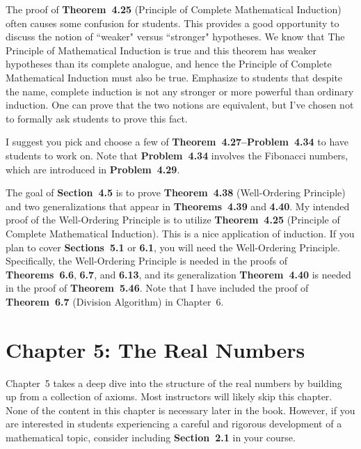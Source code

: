 \documentclass[11pt]{article}%
\newcommand{\blankline}{\pagebreak[2]\vspace{.5\baselineskip}}
\begin{document}
\blankline

The proof of \textbf{Theorem~4.25} (Principle of Complete Mathematical Induction) often causes some confusion for students.  This provides a good opportunity to discuss the notion of ``weaker" versus ``stronger" hypotheses.  We know that The Principle of Mathematical Induction is true and this theorem has weaker hypotheses than its complete analogue, and hence the Principle of Complete Mathematical Induction must also be true.  Emphasize to students that despite the name, complete induction is not any stronger or more powerful than ordinary induction.  One can prove that the two notions are equivalent, but I've chosen not to formally ask students to prove this fact.

\blankline

I suggest you pick and choose a few of \textbf{Theorem~4.27--Problem~4.34} to have students to work on.  Note that \textbf{Problem~4.34} involves the Fibonacci numbers, which are introduced in \textbf{Problem~4.29}.

\blankline

The goal of \textbf{Section~4.5} is to prove \textbf{Theorem~4.38} (Well-Ordering Principle) and two generalizations that appear in \textbf{Theorems~4.39} and \textbf{4.40}. My intended proof of the Well-Ordering Principle is to utilize \textbf{Theorem~4.25} (Principle of Complete Mathematical Induction).  This is a nice application of induction.  If you plan to cover \textbf{Sections~5.1} or \textbf{6.1}, you will need the Well-Ordering Principle.  Specifically, the Well-Ordering Principle is needed in the proofs of \textbf{Theorems~6.6}, \textbf{6.7}, and \textbf{6.13}, and its generalization \textbf{Theorem~4.40} is needed in the proof of \textbf{Theorem~5.46}. Note that I have included the proof of \textbf{Theorem~6.7} (Division Algorithm) in Chapter~6. 


\section*{Chapter 5: The Real Numbers}

Chapter~5 takes a deep dive into the structure of the real numbers by building up from a collection of axioms. Most instructors will likely skip this chapter. None of the content in this chapter is necessary later in the book. However, if you are interested in students experiencing a careful and rigorous development of a mathematical topic, consider including \textbf{Section~2.1} in your course.  
\end{document}
